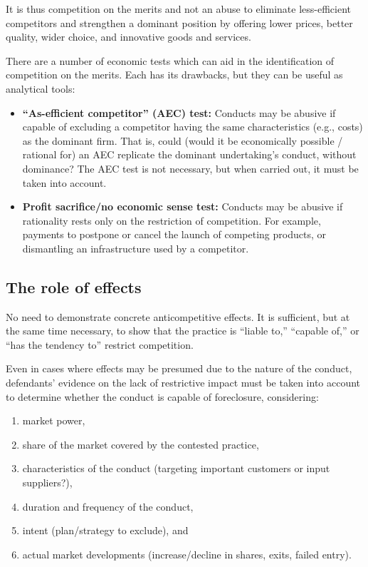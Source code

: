     It is thus competition on the merits and not an abuse to eliminate less-efficient competitors and strengthen a dominant position by offering lower prices, better quality, wider choice, and innovative goods and services.
    
    There are a number of economic tests which can aid in the identification of competition on the merits. Each has its drawbacks, but they can be useful as analytical tools:
    
    \begin{itemize}
        \item \textbf{“As-efficient competitor” (AEC) test:} Conducts may be abusive if capable of excluding a competitor having the same characteristics (e.g., costs) as the dominant firm. That is, could (would it be economically possible / rational for) an AEC replicate the dominant undertaking’s conduct, without dominance? The AEC test is not necessary, but when carried out, it must be taken into account.
        \item \textbf{Profit sacrifice/no economic sense test:} Conducts may be abusive if rationality rests only on the restriction of competition. For example, payments to postpone or cancel the launch of competing products, or dismantling an infrastructure used by a competitor.
    \end{itemize}

    \subsection{The role of effects}

        No need to demonstrate concrete anticompetitive effects.  
        It is sufficient, but at the same time necessary, to show that the practice is “liable to,” “capable of,” or “has the tendency to” restrict competition.  

        
        Even in cases where effects may be presumed due to the nature of the conduct, defendants’ evidence on the lack of restrictive impact must be taken into account to determine whether the conduct is capable of foreclosure, considering:
        
        \begin{enumerate}[label=\roman*.]
            \item market power,
            \item share of the market covered by the contested practice,
            \item characteristics of the conduct (targeting important customers or input suppliers?),
            \item duration and frequency of the conduct,
            \item intent (plan/strategy to exclude), and
            \item actual market developments (increase/decline in shares, exits, failed entry).
        \end{enumerate}

